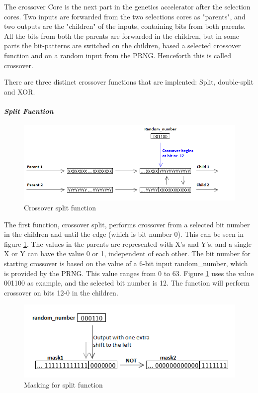 The crossover Core is the next part in the genetics accelerator after the selection cores.
Two inputs are forwarded from the two selections cores as "parents", and two outputs are the "children" of the inputs, containing bits from both parents.
All the bits from both the parents are forwarded in the children, but in some parts the bit-patterns are switched on the children, based a selected crossover function and on a random input from the PRNG.
Henceforth this is called crossover.

There are three distinct crossover functions that are implented: Split, double-split and XOR.


\paragraph{\textit{Split Fucntion}}
\begin{figure}[H]
\includegraphics[width=\textwidth]{fpga/fig/crossover_split.png}
\caption{Crossover split function}
\label{fig_crossover_split}
\end{figure}

The first function, crossover split, performs crossover from a selected bit number in the children and until the edge (which is bit number 0).
This can be seen in figure \ref{fig_crossover_split}.
The values in the parents are represented with X's and Y's, and a single X or Y can have the value 0 or 1, independent of each other.
The bit number for starting crossover is based on the value of a 6-bit input random\_number, which is provided by the PRNG. 
This value ranges from 0 to 63. 
Figure \ref{fig_crossover_split} uses the value 001100 as example, and the selected bit number is 12. 
The function will perform crossover on bits 12-0 in the children.

\begin{figure}[H]
\includegraphics[width=\textwidth]{fpga/fig/crossover_split_mask.png}
\caption{Masking for split function}
\label{fig_crossover_split_mask}
\end{figure}

